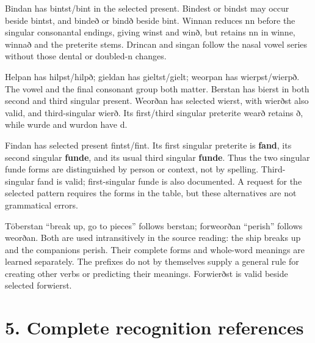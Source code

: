\par\endgroup
Bindan has bintst/\allowbreak{}bint in the selected present. Bindest or bindst may occur beside bintst, and bindeð or bindð beside bint. Winnan reduces nn before the singular consonantal endings, giving winst and winð, but retains nn in winne, winnað and the preterite stems. Drincan and singan follow the nasal vowel series without those dental or doubled-n changes.

Helpan has hilpst/\allowbreak{}hilpð; gieldan has gieltst/\allowbreak{}gielt; weorpan has wierpst/\allowbreak{}wierpð. The vowel and the final consonant group both matter. Berstan has bierst in both second and third singular present. Weorðan has selected wierst, with wierðst also valid, and third-singular wierð. Its first/\allowbreak{}third singular preterite wearð retains ð, while wurde and wurdon have d.

Findan has selected present fintst/\allowbreak{}fint. Its first singular preterite is \textbf{fand}, its second singular \textbf{funde}, and its usual third singular \textbf{funde}. Thus the two singular funde forms are distinguished by person or context, not by spelling. Third-singular fand is valid; first-singular funde is also documented. A request for the selected pattern requires the forms in the table, but these alternatives are not grammatical errors.

Tōberstan “break up, go to pieces” follows berstan; forweorðan “perish” follows weorðan. Both are used intransitively in the source reading: the ship breaks up and the companions perish. Their complete forms and whole-word meanings are learned separately. The prefixes do not by themselves supply a general rule for creating other verbs or predicting their meanings. Forwierðst is valid beside selected forwierst.

\section*{5. Complete recognition references}

